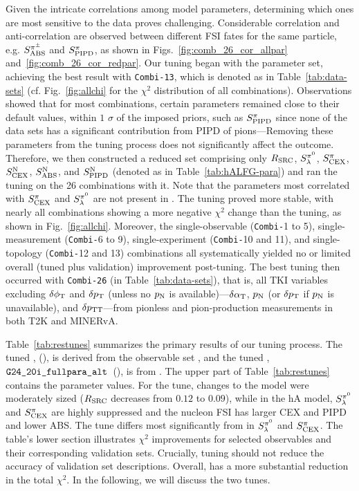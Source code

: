 Given the intricate correlations among model parameters, determining which ones are most sensitive to the data proves challenging. Considerable correlation and anti-correlation are observed between different FSI fates for the same particle, e.g. $S_\textrm{ABS}^{\pi^{\pm}}$ and $S_\textrm{PIPD}^{\pi}$, as shown in Figs.~\ref{fig:comb_26_cor_allpar} and~\ref{fig:comb_26_cor_redpar}. 
Our tuning began with the \allpar parameter set, achieving the best result with \texttt{Combi-13}, which is denoted as \cbAllPar in Table~\ref{tab:data-sets} (cf. Fig.~\ref{fig:allchi} for the $\chi^2$ distribution of all combinations).
Observations showed that for most combinations, certain parameters remained close to their default values, within $1$ $\sigma$ of the imposed priors, such as $S_\textrm{PIPD}^{\pi}$ since none of the data sets has a significant contribution from PIPD of pions---Removing these parameters from the tuning process does not significantly affect the outcome.
Therefore, we then constructed a reduced set comprising only $R_\textrm{SRC}$, $S_\lambda^{\pi^{0}}$, $S_\textrm{CEX}^{\pi}$, $S_\textrm{CEX}^\textrm{N}$, $S_\textrm{ABS}^\textrm{N}$, and $S_\textrm{PIPD}^\textrm{N}$ (denoted as \redpar in Table~\ref{tab:hALFG-para}) and ran the tuning on the 26 combinations with it. Note that the parameters most correlated with $S_\textrm{CEX}^{\pi}$ and $S_\lambda^{\pi^{0}}$ are not present in \redpar. The \redpar tuning proved more stable, with nearly all combinations showing a more negative $\chi^2$ change than the \allpar tuning, as shown in Fig.~\ref{fig:allchi}. Moreover, the single-observable (\texttt{Combi-}1 to 5), single-measurement (\texttt{Combi-}6 to 9), single-experiment (\texttt{Combi-}10 and 11), and single-topology (\texttt{Combi-}12 and 13) combinations all systematically yielded no or limited overall (tuned plus validation) improvement post-tuning. The best tuning then occurred with \texttt{Combi-26} (\cbRedPar in Table~\ref{tab:data-sets}), that is, all TKI variables excluding $\delta\phi_\textrm{T}$ and $\delta p_\textrm{T}$ (unless no $p_\textrm{N}$ is available)---$\delta\alpha_\textrm{T}$, $p_\textrm{N}$ (or $\delta p_\textrm{T}$ if $p_\textrm{N}$ is unavailable), and $\delta p_\textrm{TT}$---from pionless and pion-production measurements in both T2K and MINERvA. 

Table~\ref{tab:restunes} summarizes the primary results of our tuning process. The tuned \redpar, \restunefull (\gC), is derived from the observable set \cbRedPar, and the tuned \allpar, $\texttt{G24\_20i\_fullpara\_alt}$~(\gT), is from \cbAllPar. The upper part of Table~\ref{tab:restunes} contains the parameter values. 
For the  \gC tune, changes to the \sfcfg model were moderately sized ($R_\textrm{SRC}$ decreases from $0.12$ to $0.09$), while in the hA model, $S_\lambda^{\pi^{0}}$ and $S_\textrm{CEX}^{\pi}$ are highly suppressed and the nucleon FSI has larger CEX and PIPD and lower ABS.  The tune \gT differs most significantly from \gC in $S_\lambda^{\pi^{0}}$ and $S_\textrm{CEX}^{\pi}$. The table's lower section illustrates $\chi^2$ improvements for selected observables and their corresponding validation sets. Crucially, tuning should not reduce the accuracy of validation set descriptions. Overall, \gC has a more substantial reduction in the total $\chi^2$. In the following, we will discuss the two tunes.

